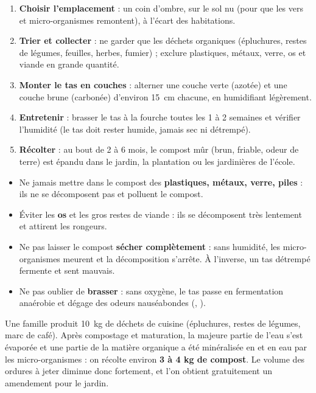 \documentclass[11pt]{article}
\begin{document}
\begin{methode}
\begin{enumerate}
\item \textbf{Choisir l'emplacement} : un coin d'ombre, sur le sol nu (pour que les vers et micro-organismes remontent), à l'écart des habitations.
\item \textbf{Trier et collecter} : ne garder que les déchets organiques (épluchures, restes de légumes, feuilles, herbes, fumier) ; exclure plastiques, métaux, verre, os et viande en grande quantité.
\item \textbf{Monter le tas en couches} : alterner une couche verte (azotée) et une couche brune (carbonée) d'environ \SI{15}{cm} chacune, en humidifiant légèrement.
\item \textbf{Entretenir} : brasser le tas à la fourche toutes les 1 à 2 semaines et vérifier l'humidité (le tas doit rester humide, jamais sec ni détrempé).
\item \textbf{Récolter} : au bout de 2 à 6 mois, le compost mûr (brun, friable, odeur de terre) est épandu dans le jardin, la plantation ou les jardinières de l'école.
\end{enumerate}
\end{methode}

\begin{attention}
\begin{itemize}
\item Ne jamais mettre dans le compost des \textbf{plastiques, métaux, verre, piles} : ils ne se décomposent pas et polluent le compost.
\item Éviter les \textbf{os} et les gros restes de viande : ils se décomposent très lentement et attirent les rongeurs.
\item Ne pas laisser le compost \textbf{sécher complètement} : sans humidité, les micro-organismes meurent et la décomposition s'arrête. À l'inverse, un tas détrempé fermente et sent mauvais.
\item Ne pas oublier de \textbf{brasser} : sans oxygène, le tas passe en fermentation anaérobie et dégage des odeurs nauséabondes (, ).
\end{itemize}
\end{attention}

\begin{exemplebox}
Une famille produit \SI{10}{kg} de déchets de cuisine (épluchures, restes de légumes, marc de café). Après compostage et maturation, la majeure partie de l'eau s'est évaporée et une partie de la matière organique a été minéralisée en  et en eau par les micro-organismes : on récolte environ \textbf{3 à 4 kg de compost}. Le volume des ordures à jeter diminue donc fortement, et l'on obtient gratuitement un amendement pour le jardin.
\end{exemplebox}
\end{document}
